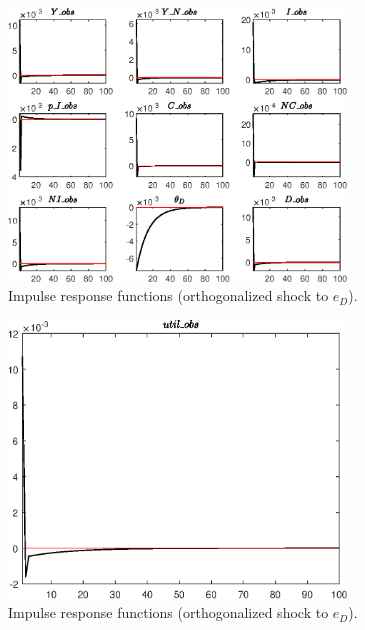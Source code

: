 \begin{figure}[H]
\centering 
\includegraphics[width=0.80\textwidth]{BRS_util/graphs/BRS_util_IRF_e_D1}
\caption{Impulse response functions (orthogonalized shock to ${e_D}$).}\label{Fig:IRF:e_D:1}
\end{figure}
 
\begin{figure}[H]
\centering 
\includegraphics[width=0.80\textwidth]{BRS_util/graphs/BRS_util_IRF_e_D2}
\caption{Impulse response functions (orthogonalized shock to ${e_D}$).}\label{Fig:IRF:e_D:2}
\end{figure}
 
 
